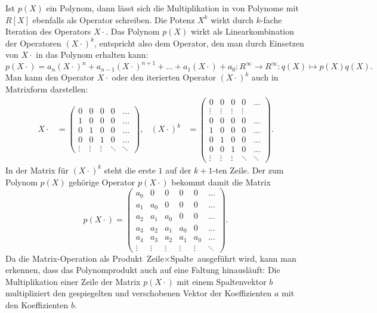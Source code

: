 Ist $p(X)$ ein Polynom, dann lässt sich die Multiplikation
in von Polynome mit $R[X]$ ebenfalls als Operator schreiben.
Die Potenz $X^k$ wirkt durch $k$-fache Iteration des Operators
$X\cdot$.
Das Polynom $p(X)$ wirkt als Linearkombination der Operatoren $(X\cdot)^k$,
entspricht also dem Operator, den man durch Einsetzen von $X\cdot$
in das Polynom erhalten kann:
\[
p(X\cdot)
=
a_n(X\cdot)^n + a_{n-1}(X\cdot)^{n+1} + \dots + a_1(X\cdot) + a_0
\colon
R^\infty \to R^\infty
:
q(X) 
\mapsto
p(X)q(X).
\]
Man kann den Operator $X\cdot$ oder den iterierten Operator
$(X\cdot)^k$ auch in Matrixform darstellen:
\begin{align*}
{X\cdot}
&=
\begin{pmatrix}
0&0&0&0&\dots\\
1&0&0&0&\dots\\
0&1&0&0&\dots\\
0&0&1&0&\dots\\
\vdots&\vdots&\vdots&\ddots&\ddots
\end{pmatrix},
&
(X\cdot)^k
&=
\begin{pmatrix}
  0   &  0   &  0   &  0   &\dots\\
\vdots&\vdots&\vdots&\vdots&     \\
  0   &  0   &  0   &  0   &\dots\\
  1   &  0   &  0   &  0   &\dots\\
  0   &  1   &  0   &  0   &\dots\\
  0   &  0   &  1   &  0   &\dots\\
\vdots&\vdots&\vdots&\ddots&\ddots
\end{pmatrix}.
\end{align*}
In der Matrix für $(X\cdot)^k$ steht die erste $1$ auf der
$k+1$-ten Zeile.
Der zum Polynom $p(X)$ gehörige Operator $p(X\cdot)$ bekommt
damit die Matrix
\[
p(X\cdot)
=
\begin{pmatrix}
a_0    & 0     &  0   &  0   &  0   & \dots  \\
a_1    &a_0    &  0   &  0   &  0   & \dots  \\
a_2    &a_1    & a_0  &  0   &  0   & \dots  \\
a_3    &a_2    & a_1  & a_0  &  0   & \dots  \\
a_4    &a_3    & a_2  & a_1  & a_0  & \dots  \\
\vdots &\vdots &\vdots&\vdots&\vdots&\ddots
\end{pmatrix}.
\]
Da die Matrix-Operation als Produkt
$\text{Zeile}\times\text{Spalte}$ ausgeführt wird,
kann man erkennen, dass das Polynomprodukt auch auf
eine Faltung hinausläuft:
Die Multiplikation einer Zeile der Matrix $p(X\cdot)$  mit
einem Spaltenvektor $b$ multipliziert den gespiegelten und verschobenen
Vektor der Koeffizienten $a$ mit den Koeffizienten $b$.

